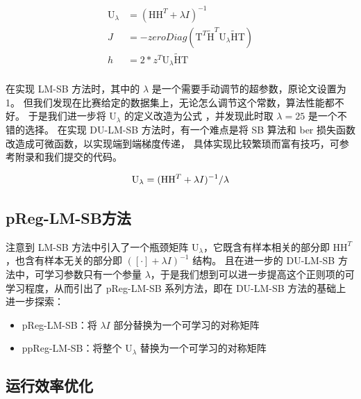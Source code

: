 \documentclass[withoutpreface,bwprint]{cumcmthesis}
\begin{document}
\begin{equation}
\begin{split}
\mathrm U_\lambda &= (\mathrm H \mathrm H^T + \lambda I)^{-1} \\
J &= -zeroDiag(\mathrm T^T \tilde{\mathrm H}^T \mathrm U_\lambda \tilde{\mathrm H} \mathrm T) \\
h &= 2 * z^T \mathrm U_\lambda \tilde{\mathrm H} \mathrm T \\
\end{split}
\label{eq:to-ising-du}
\end{equation}

在实现 LM-SB 方法时，其中的 $ \lambda $ 是一个需要手动调节的超参数，原论文设置为 1。
但我们发现在比赛给定的数据集上，无论怎么调节这个常数，算法性能都不好。
于是我们进一步将 $ \mathrm U_\lambda $ 的定义改造为公式 \label{eq:U-lmbd}，并发现此时取 $ \lambda = 25 $ 是一个不错的选择。
在实现 DU-LM-SB 方法时，有一个难点是将 SB 算法和 ber 损失函数改造成可微函数，以实现端到端梯度传递，
具体实现比较繁琐而富有技巧，可参考附录和我们提交的代码。

\begin{equation}
\mathrm U_\lambda = (\mathrm H \mathrm H^T + \lambda I)^{-1} / \lambda \\
\label{eq:U-lmbd}
\end{equation}

\subsection{pReg-LM-SB方法}

注意到 LM-SB 方法中引入了一个瓶颈矩阵 $ \mathrm U_\lambda $，它既含有样本相关的部分即 $ \mathrm H \mathrm H^T $，也含有样本无关的部分即 $ ([\cdot] + \lambda I)^{-1} $ 结构。
且在进一步的 DU-LM-SB 方法中，可学习参数只有一个参量 $ \lambda $，于是我们想到可以进一步提高这个正则项的可学习程度，从而引出了 pReg-LM-SB 系列方法，即在 DU-LM-SB 方法的基础上进一步探索：

\begin{itemize}
\item pReg-LM-SB：将 $  \lambda I $ 部分替换为一个可学习的对称矩阵
\item ppReg-LM-SB：将整个 $ \mathrm U_\lambda $ 替换为一个可学习的对称矩阵
\end{itemize}

\subsection{运行效率优化}
\end{document}
